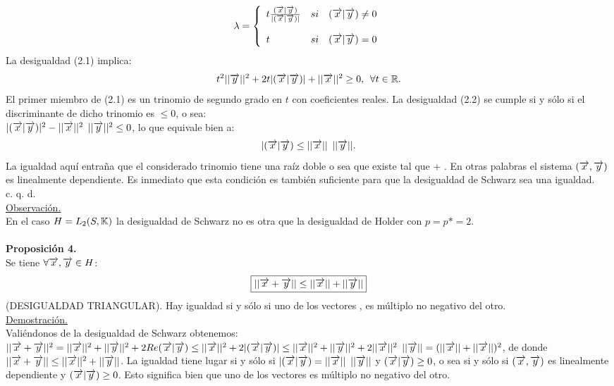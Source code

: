 \begin{equation*}
\lambda= \left\{ \begin{array}{lcc}
            t\frac{(\overrightarrow{x} | \overrightarrow{y})}{| (\overrightarrow{x} | \overrightarrow{y})| } &   si  & (\overrightarrow{x} | \overrightarrow{y} ) \neq 0 \\
             \\  t &  si &  (\overrightarrow{x} | \overrightarrow{y} )=0 \\
             \end{array}
   \right.
\end{equation*}
La desigualdad (2.1) implica:
\begin{equation}
t^2 || \overrightarrow{y} || ^2+ 2t | (\overrightarrow{x} |\overrightarrow{y})| + || \overrightarrow{x} ||^2 \geq 0, \phantom{s} \forall t\in \mathbb{R}.
\end{equation}
El primer miembro de (2.1) es un trinomio de segundo grado en $t$ con coeficientes reales. La desigualdad (2.2) se cumple si y sólo si el discriminante de dicho trinomio es $\leq 0$, o sea: \\
$| (\overrightarrow{x} | \overrightarrow{y} ) |^2 - || \overrightarrow{x} ||^2 \phantom{s} || \overrightarrow{y}|| ^2 \leq 0$, lo que equivale bien a: 
$$
| (\overrightarrow{x} | \overrightarrow{y} ) \leq || \overrightarrow{x} || \phantom{s} || \overrightarrow{y} ||.
$$
La igualdad aquí entraña que el considerado trinomio tiene una raíz doble o sea que existe \lam \en \C \phantom{s} tal que \xraya +\lam {} . En otras palabras el sistema $(\overrightarrow{x}, \overrightarrow{y})$ es linealmente dependiente. Es inmediato que esta condición es también suficiente para que la desigualdad de Schwarz sea una igualdad. \\
\phantom{sadasdaadsaadasdasdasdasdasdasdvsadasdasdadasssasaa} c. q. d. \\
\underline{Observación.}\\
En el caso $H=L_2 (S,\mathbb{K})$ la desigualdad de Schwarz no es otra que la desigualdad de Holder con $p=p*=2$. \\ \\
\textbf{Proposición 4.} \\
Se tiene $\forall \overrightarrow{x}, \overrightarrow{y} \in H$: 
\begin{equation*}
\boxed{ || \overrightarrow{x} + \overrightarrow{y} || \leq || \overrightarrow{x} || + ||\overrightarrow{y} ||}
\end{equation*} (DESIGUALDAD TRIANGULAR).
Hay igualdad si y sólo si uno de los vectores \xraya , \yraya \phantom{} es múltiplo no negativo del otro.\\
\underline{Demostración.}\\
Valiéndonos de la desigualdad de Schwarz obtenemos: \\
$|| \overrightarrow{x} + \overrightarrow{y} ||^2 =|| \overrightarrow{x} ||^2 + ||\overrightarrow{y} ||^2+2Re (\overrightarrow{x} | \overrightarrow{y} ) \leq || \overrightarrow{x} ||^2 +2|(\overrightarrow{x} | \overrightarrow{y})| \leq  || \overrightarrow{x} ||^2 + || \overrightarrow{y} ||^2+2 || \overrightarrow{x} ||^2 \phantom{s} || \overrightarrow{y} || = ( || \overrightarrow{x} ||+ || \overrightarrow{x} ||)^2$, de donde $|| \overrightarrow{x} + \overrightarrow{y}|| \leq || \overrightarrow{x} ||^2+|| \overrightarrow{y} ||$.
La igualdad tiene lugar si y sólo si $|(\overrightarrow{x} | \overrightarrow{y} ) = || \overrightarrow{x} || \phantom{s} || \overrightarrow{y} ||$ y $(\overrightarrow{x} | \overrightarrow{y}) \geq 0$, o sea si y sólo si $(\overrightarrow{x}, \overrightarrow{y})$ es linealmente dependiente y $(\overrightarrow{x} | \overrightarrow{y}) \geq 0$. Esto significa bien que uno de los vectores es múltiplo no negativo del otro. \\ \\

